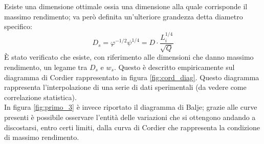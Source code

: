 Esiste una dimensione ottimale ossia una dimensione alla quale corrisponde il massimo rendimento; va però definita un’ulteriore grandezza detta diametro specifico:
\begin{equation}
D_s= \varphi^{-1/2} \psi^{1/4} = D \cdot \frac{L_i^{1/4}}{\sqrt{Q}}
\end{equation}
È stato verificato che esiste, con riferimento alle dimensioni che danno massimo rendimento, un legame tra $D_s$ e $w_s$.
Questo è descritto empiricamente sul diagramma di Cordier rappresentato in figura \ref{fig:cord_diag}. Questo diagramma rappresenta l’interpolazione di una serie di dati sperimentali (da vedere come correlazione statistica).\\
In figura \ref{fig:primo_3} è invece riportato il diagramma di Balje; grazie alle curve presenti è possibile osservare l’entità delle variazioni che si ottengono andando a discostarsi, entro certi limiti, dalla curva di Cordier che rappresenta la condizione di massimo rendimento.
